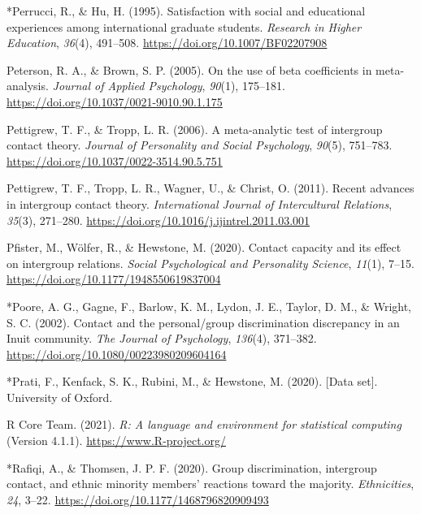\documentclass[12pt, letterpaper]{article}
\newenvironment{CSLReferences}[2]{}{}
\begin{document}
\begin{CSLReferences}{1}{0}
\leavevmode\hypertarget{ref-823}{}%
*Perrucci, R., \& Hu, H. (1995). Satisfaction with social and
educational experiences among international graduate students.
\emph{Research in Higher Education}, \emph{36}(4), 491--508.
\url{https://doi.org/10.1007/BF02207908}

\leavevmode\hypertarget{ref-peterson_use_2005}{}%
Peterson, R. A., \& Brown, S. P. (2005). On the use of beta coefficients
in meta-analysis. \emph{Journal of Applied Psychology}, \emph{90}(1),
175--181. \url{https://doi.org/10.1037/0021-9010.90.1.175}

\leavevmode\hypertarget{ref-pettigrew_meta-analytic_2006}{}%
Pettigrew, T. F., \& Tropp, L. R. (2006). A meta-analytic test of
intergroup contact theory. \emph{Journal of Personality and Social
Psychology}, \emph{90}(5), 751--783.
\url{https://doi.org/10.1037/0022-3514.90.5.751}

\leavevmode\hypertarget{ref-pettigrew_recent_2011}{}%
Pettigrew, T. F., Tropp, L. R., Wagner, U., \& Christ, O. (2011). Recent
advances in intergroup contact theory. \emph{International Journal of
Intercultural Relations}, \emph{35}(3), 271--280.
\url{https://doi.org/10.1016/j.ijintrel.2011.03.001}

\leavevmode\hypertarget{ref-pfister_contact_2020}{}%
Pfister, M., Wölfer, R., \& Hewstone, M. (2020). Contact capacity and
its effect on intergroup relations. \emph{Social Psychological and
Personality Science}, \emph{11}(1), 7--15.
\url{https://doi.org/10.1177/1948550619837004}

\leavevmode\hypertarget{ref-1762}{}%
*Poore, A. G., Gagne, F., Barlow, K. M., Lydon, J. E., Taylor, D. M., \&
Wright, S. C. (2002). Contact and the personal/group discrimination
discrepancy in an {Inuit} community. \emph{The Journal of Psychology},
\emph{136}(4), 371--382. \url{https://doi.org/10.1080/00223980209604164}

\leavevmode\hypertarget{ref-2391}{}%
*Prati, F., Kenfack, S. K., Rubini, M., \& Hewstone, M. (2020). {[}Data
set{]}. University of Oxford.

\leavevmode\hypertarget{ref-r_version_2021}{}%
R Core Team. (2021). \emph{R: A language and environment for statistical
computing} (Version 4.1.1). \url{https://www.R-project.org/}

\leavevmode\hypertarget{ref-3051}{}%
*Rafiqi, A., \& Thomsen, J. P. F. (2020). Group discrimination,
intergroup contact, and ethnic minority members' reactions toward the
majority. \emph{Ethnicities}, \emph{24}, 3--22.
\url{https://doi.org/10.1177/1468796820909493}


\end{CSLReferences}
\end{document}
